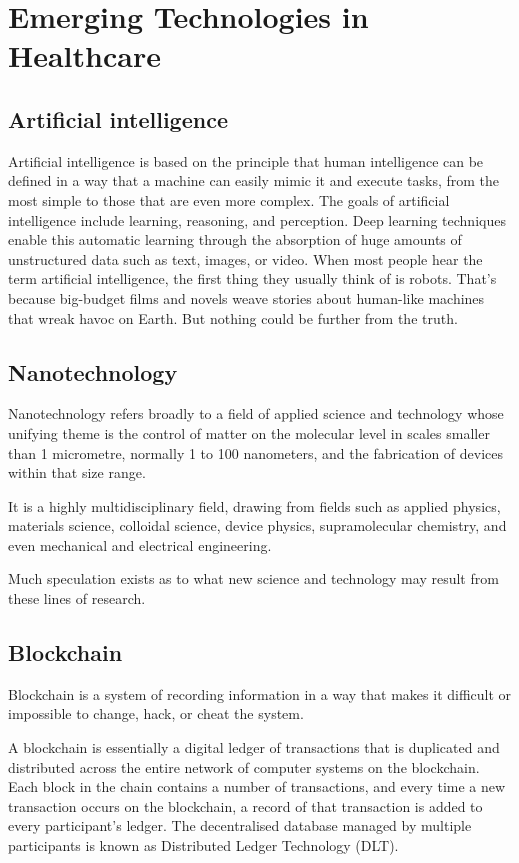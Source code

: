 \documentclass{article}
\begin{document}
\section{Emerging Technologies in Healthcare}

\subsection{Artificial intelligence}

Artificial intelligence is based on the principle that human intelligence can be defined in a way that a machine can easily mimic it and execute tasks, from the most simple to those that are even more complex. The goals of artificial intelligence include learning, reasoning, and perception.
Deep learning techniques enable this automatic learning through the absorption of huge amounts of unstructured data such as text, images, or video. When most people hear the term artificial intelligence, the first thing they usually think of is robots. That's because big-budget films and novels weave stories about human-like machines that wreak havoc on Earth. But nothing could be further from the truth.

\subsection{Nanotechnology}
Nanotechnology refers broadly to a field of applied science and technology whose unifying theme is the control of matter on the molecular level in scales smaller than 1 micrometre, normally 1 to 100 nanometers, and the fabrication of devices within that size range.

It is a highly multidisciplinary field, drawing from fields such as applied physics, materials science, colloidal science, device physics, supramolecular chemistry, and even mechanical and electrical engineering.

Much speculation exists as to what new science and technology may result from these lines of research.
\subsection{Blockchain}

Blockchain is a system of recording information in a way that makes it difficult or impossible to change, hack, or cheat the system.

A blockchain is essentially a digital ledger of transactions that is duplicated and distributed across the entire network of computer systems on the blockchain. Each block in the chain contains a number of transactions, and every time a new transaction occurs on the blockchain, a record of that transaction is added to every participant’s ledger. The decentralised database managed by multiple participants is known as Distributed Ledger Technology (DLT).
\end{document}
